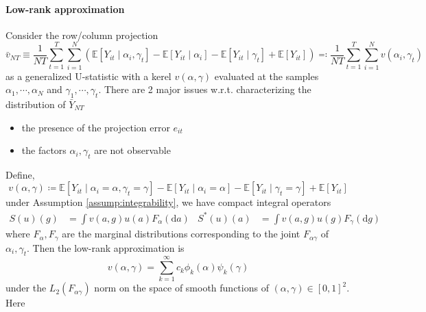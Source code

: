 \documentclass[twoside]{article}
\begin{document}
\paragraph*{Low-rank approximation}
Consider the row/column projection
\begin{equation*}
    \bar{v}_{NT} \equiv \frac{1}{NT}\sum^T_{t=1}\sum^N_{i=1}\left(\mathbb{E}\left[Y_{it}\mid \alpha_i,\gamma_t\right] -\mathbb{E}\left[Y_{it}\mid \alpha_i\right] -\mathbb{E}\left[Y_{it}\mid \gamma_t\right] +\mathbb{E}\left[Y_{it}\right] \right) \eqcolon \frac{1}{NT}\sum^T_{t=1}\sum^N_{i=1}v(\alpha_i,\gamma_t)
\end{equation*}
as a generalized U-statistic with a kerel $v(\alpha,\gamma)$ evaluated at the samples $\alpha_1,\cdots,\alpha_N$ and $\gamma_1,\cdots,\gamma_t$. There are 2 major issues w.r.t. characterizing the distribution of $\bar{Y}_{NT}$
\begin{itemize}
    \item the presence of the projection error $e_{it}$
    \item the factors $\alpha_i,\gamma_t$ are not observable
\end{itemize}
Define,
$$
v(\alpha,\gamma) \coloneq \mathbb{E}\left[Y_{it}\mid \alpha_i=\alpha,\gamma_t=\gamma\right] - \mathbb{E}\left[Y_{it}\mid \alpha_i=\alpha\right] - \mathbb{E}\left[Y_{it}\mid \gamma_t=\gamma\right] + \mathbb{E}\left[Y_{it}\right]
$$
under Assumption \ref{assump:integrability}, we have compact integral operators
\begin{align*}
    S(u)(g)&=\int v(a,g)u(a)F_{\alpha}(\mathrm{d}a) & S^*(u)(a)&=\int v(a,g)u(g)F_{\gamma}(\mathrm{d}g)
\end{align*}
where $F_{\alpha},F_{\gamma}$ are the marginal distributions corresponding to the joint $F_{\alpha\gamma}$ of $\alpha_i,\gamma_t$. Then the low-rank approximation is
\begin{equation}\label{eq:low-rank_approximation}
    v(\alpha,\gamma) = \sum^{\infty}_{k=1}c_k\phi_k(\alpha)\psi_k(\gamma)
\end{equation}
under the $L_2(F_{\alpha\gamma})$ norm on the space of smooth functions of $(\alpha,\gamma)\in[0,1]^2$. Here 
\end{document}
